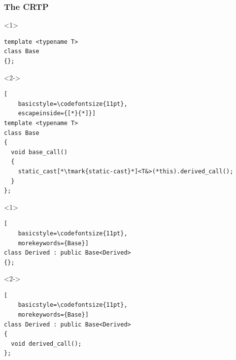 \documentclass[14pt]{beamer}
\begin{document}
\begin{frame}[fragile]
  \frametitle{The CRTP}

  \begin{overlayarea}{\textwidth}{4.5cm}

  \begin{onlyenv}<1>
  \begin{lstlisting}[basicstyle=\codefontsize{11pt}]
template <typename T>
class Base
{};
  \end{lstlisting}
  \end{onlyenv}

  \begin{onlyenv}<2->
  \begin{lstlisting}[
    basicstyle=\codefontsize{11pt},
    escapeinside={[*}{*]}]
template <typename T>
class Base
{
  void base_call()
  {
    static_cast[*\tmark{static-cast}*]<T&>(*this).derived_call();
  }
};
  \end{lstlisting}
  \end{onlyenv}

  \end{overlayarea}

  \begin{overlayarea}{\textwidth}{4cm}

  \begin{onlyenv}<1>
  \begin{lstlisting}[
    basicstyle=\codefontsize{11pt},
    morekeywords={Base}]
class Derived : public Base<Derived>
{};
  \end{lstlisting}
  \end{onlyenv}

  \begin{onlyenv}<2->
  \begin{lstlisting}[
    basicstyle=\codefontsize{11pt},
    morekeywords={Base}]
class Derived : public Base<Derived>
{
  void derived_call();
};
  \end{lstlisting}
  \end{onlyenv}

  \end{overlayarea}

  \nointerlineskip

\end{frame}
\end{document}
